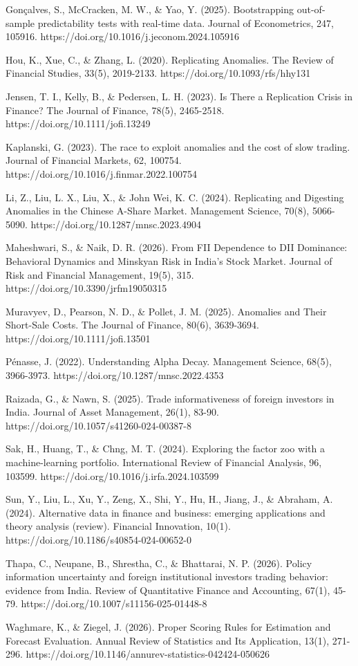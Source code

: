 \documentclass[12pt,a4paper]{article}
\begin{document}
Gonçalves, S., McCracken, M. W., \& Yao, Y. (2025). Bootstrapping out-of-sample predictability tests with real-time data. Journal of Econometrics, 247, 105916. https://doi.org/10.1016/j.jeconom.2024.105916

Hou, K., Xue, C., \& Zhang, L. (2020). Replicating Anomalies. The Review of Financial Studies, 33(5), 2019-2133. https://doi.org/10.1093/rfs/hhy131

Jensen, T. I., Kelly, B., \& Pedersen, L. H. (2023). Is There a Replication Crisis in Finance? The Journal of Finance, 78(5), 2465-2518. https://doi.org/10.1111/jofi.13249

Kaplanski, G. (2023). The race to exploit anomalies and the cost of slow trading. Journal of Financial Markets, 62, 100754. https://doi.org/10.1016/j.finmar.2022.100754

Li, Z., Liu, L. X., Liu, X., \& John Wei, K. C. (2024). Replicating and Digesting Anomalies in the Chinese A-Share Market. Management Science, 70(8), 5066-5090. https://doi.org/10.1287/mnsc.2023.4904

Maheshwari, S., \& Naik, D. R. (2026). From FII Dependence to DII Dominance: Behavioral Dynamics and Minskyan Risk in India’s Stock Market. Journal of Risk and Financial Management, 19(5), 315. https://doi.org/10.3390/jrfm19050315

Muravyev, D., Pearson, N. D., \& Pollet, J. M. (2025). Anomalies and Their Short-Sale Costs. The Journal of Finance, 80(6), 3639-3694. https://doi.org/10.1111/jofi.13501

Pénasse, J. (2022). Understanding Alpha Decay. Management Science, 68(5), 3966-3973. https://doi.org/10.1287/mnsc.2022.4353

Raizada, G., \& Nawn, S. (2025). Trade informativeness of foreign investors in India. Journal of Asset Management, 26(1), 83-90. https://doi.org/10.1057/s41260-024-00387-8

Sak, H., Huang, T., \& Chng, M. T. (2024). Exploring the factor zoo with a machine-learning portfolio. International Review of Financial Analysis, 96, 103599. https://doi.org/10.1016/j.irfa.2024.103599

Sun, Y., Liu, L., Xu, Y., Zeng, X., Shi, Y., Hu, H., Jiang, J., \& Abraham, A. (2024). Alternative data in finance and business: emerging applications and theory analysis (review). Financial Innovation, 10(1). https://doi.org/10.1186/s40854-024-00652-0

Thapa, C., Neupane, B., Shrestha, C., \& Bhattarai, N. P. (2026). Policy information uncertainty and foreign institutional investors trading behavior: evidence from India. Review of Quantitative Finance and Accounting, 67(1), 45-79. https://doi.org/10.1007/s11156-025-01448-8

Waghmare, K., \& Ziegel, J. (2026). Proper Scoring Rules for Estimation and Forecast Evaluation. Annual Review of Statistics and Its Application, 13(1), 271-296. https://doi.org/10.1146/annurev-statistics-042424-050626
\end{document}
